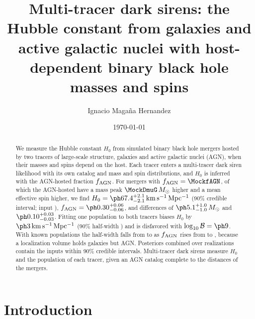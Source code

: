 \documentclass[aps,prd,reprint,amsmath,amssymb,nofootinbib]{revtex4-2}
\newcommand{\kmsMpc}{\,{\rm km\,s^{-1}\,Mpc^{-1}}}
\newcommand{\Msun}{\,M_\odot}
\newcommand{\fAGN}{f_{\rm AGN}}
\newcommand{\lB}{\log_{10}\mathcal{B}}
\begin{document}
\title{Multi-tracer dark sirens: the Hubble constant from galaxies and active galactic nuclei with host-dependent binary black hole masses and spins}

\author{Ignacio Maga\~na Hernandez}

\date{\today}

\begin{abstract}
We measure the Hubble constant $H_0$ from simulated binary black hole mergers hosted by two tracers of large-scale structure, galaxies and active galactic nuclei (AGN), when their masses and spins depend on the host.
Each tracer enters a multi-tracer dark siren likelihood with its own catalog and mass and spin distributions, and $H_0$ is inferred with the AGN-hosted fraction $\fAGN$.
For \MockNev{} mergers with $\fAGN=\MockfAGN$, of which the AGN-hosted have a mass peak $\MockDmuG\Msun$ higher and a mean effective spin \MockDmuChi{} higher, we find $H_0=\IndTwoPopHzero\kmsMpc$ (90\% credible interval; input \MockHzero), $\fAGN=\IndTwoPopfAGN$, and differences of $\IndTwoPopDm\Msun$ and $\IndTwoPopDchi$. %
Fitting one population to both tracers biases $H_0$ by $\IndBias\kmsMpc$ (90\% half-width \IndHWOnePop) and is disfavored with $\lB=\IndLB$. %
With known populations the half-width falls from \IndHWGal{} to \IndHWAGN{} as $\fAGN$ rises from \PriorfLo{} to \PriorfHi, because a localization volume holds \PureGalHostsPerVol{} galaxies but \PureAGNHostsPerVol{} AGN. %
Posteriors combined over realizations contain the inputs within 90\% credible intervals. %
Multi-tracer dark sirens measure $H_0$ and the population of each tracer, given an AGN catalog complete to the distances of the mergers. %
\end{abstract}

\maketitle

\section{Introduction}
\label{sec:intro}
\end{document}
